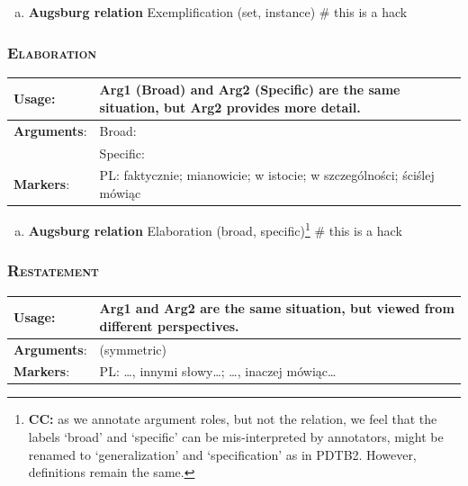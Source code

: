 \documentclass{udisc}
\newcommand{\noteCC}[1]{\footnote{{\textbf{CC:} {#1}}}}
\begin{document}
\begin{enumerate}[a)]
\item \textbf{Augsburg relation} Exemplification (set, instance)
\nonstopmode # this is a hack
\end{enumerate}
\errorstopmode



\subsubsection{\textsc{Elaboration}}

\begin{tabularx}{\textwidth}{|l|L|}
\hline

\textbf{Usage}:           &  Arg1 (Broad) and Arg2 (Specific) are the same situation, but Arg2 provides more detail. \\
\hline

\textbf{Arguments}:       &  Broad:  \\
                          &  Specific: \\
\hline

\textbf{Markers}:        &  PL: faktycznie; mianowicie; w istocie; w szczególności; ściślej mówiąc \\
\hline

\end{tabularx}

\begin{enumerate}[a)]
\item \textbf{Augsburg relation} Elaboration (broad, specific)\noteCC{as we annotate argument roles, but not the relation, we feel that the labels `broad' and `specific' can be mis-interpreted by annotators, might be renamed to `generalization' and `specification' as in PDTB2. However, definitions remain the same.}
\nonstopmode # this is a hack
\end{enumerate}
\errorstopmode



\subsubsection{\textsc{Restatement}}

\begin{tabularx}{\textwidth}{|l|L|}
\hline

\textbf{Usage}:           &  Arg1 and Arg2 are the same situation, but viewed from different perspectives. \\
\hline

\textbf{Arguments}:       &  (symmetric) \\
\hline

\textbf{Markers}:        &  PL: …, innymi słowy…; …, inaczej mówiąc… \\
\hline

\end{tabularx}
\end{document}
